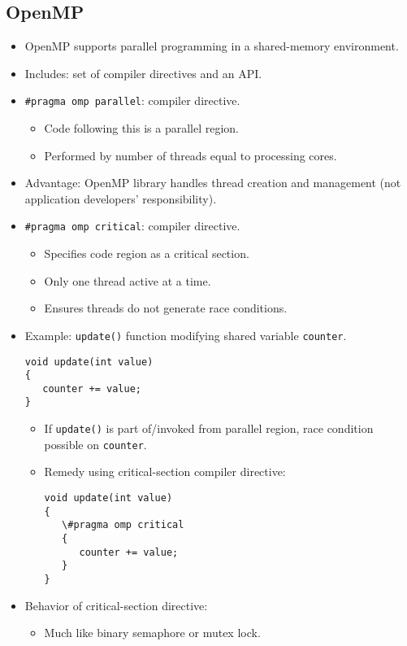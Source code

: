 \subsection{OpenMP}
\begin{itemize}
    \item OpenMP supports parallel programming in a shared-memory environment.
    \item Includes: set of compiler directives and an API.
    \item \texttt{\#pragma omp parallel}: compiler directive.
    \begin{itemize}
        \item Code following this is a parallel region.
        \item Performed by number of threads equal to processing cores.
    \end{itemize}
    \item Advantage: OpenMP library handles thread creation and management (not application developers' responsibility).
    \item \texttt{\#pragma omp critical}: compiler directive.
    \begin{itemize}
        \item Specifies code region as a critical section.
        \item Only one thread active at a time.
        \item Ensures threads do not generate race conditions.
    \end{itemize}
    \item Example: \texttt{update()} function modifying shared variable \texttt{counter}.
    \begin{verbatim}
void update(int value)
{
   counter += value;
}
    \end{verbatim}
    \begin{itemize}
        \item If \texttt{update()} is part of/invoked from parallel region, race condition possible on \texttt{counter}.
        \item Remedy using critical-section compiler directive:
        \begin{verbatim}
void update(int value)
{
   \#pragma omp critical
   {
      counter += value;
   }
}
        \end{verbatim}
    \end{itemize}
    \item Behavior of critical-section directive:
    \begin{itemize}
        \item Much like binary semaphore or mutex lock.

\end{itemize}
\end{itemize}
